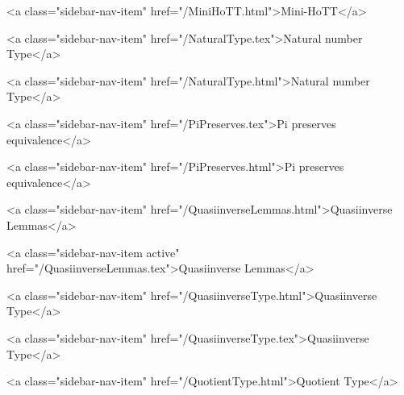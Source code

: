       
    
      
        
          <a class="sidebar-nav-item" href="/MiniHoTT.html">Mini-HoTT</a>
        
      
    
      
        
      
    
      
        
          <a class="sidebar-nav-item" href="/NaturalType.tex">Natural number Type</a>
        
      
    
      
        
          <a class="sidebar-nav-item" href="/NaturalType.html">Natural number Type</a>
        
      
    
      
        
          <a class="sidebar-nav-item" href="/PiPreserves.tex">Pi preserves equivalence</a>
        
      
    
      
        
          <a class="sidebar-nav-item" href="/PiPreserves.html">Pi preserves equivalence</a>
        
      
    
      
        
          <a class="sidebar-nav-item" href="/QuasiinverseLemmas.html">Quasiinverse Lemmas</a>
        
      
    
      
        
          <a class="sidebar-nav-item active" href="/QuasiinverseLemmas.tex">Quasiinverse Lemmas</a>
        
      
    
      
        
          <a class="sidebar-nav-item" href="/QuasiinverseType.html">Quasiinverse Type</a>
        
      
    
      
        
          <a class="sidebar-nav-item" href="/QuasiinverseType.tex">Quasiinverse Type</a>
        
      
    
      
        
          <a class="sidebar-nav-item" href="/QuotientType.html">Quotient Type</a>
        
      
    
